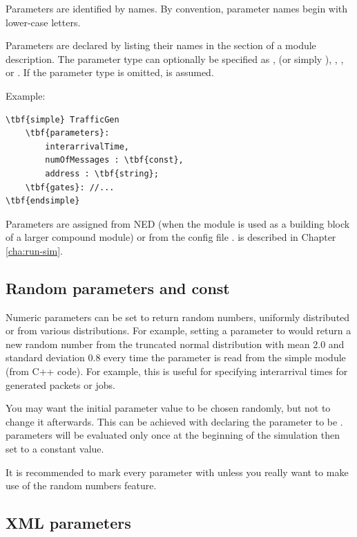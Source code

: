 Parameters are identified by names.
By convention, parameter names begin with lower-case letters.

Parameters are declared by listing their names in the
 section of a module description.
The parameter type can optionally be specified as ,
 (or simply ), , ,
or . If the parameter type is omitted,  is assumed.

Example:

\begin{Verbatim}[commandchars=\\\{\}]
\tbf{simple} TrafficGen
    \tbf{parameters}:
        interarrivalTime,
        numOfMessages : \tbf{const},
        address : \tbf{string};
    \tbf{gates}: //...
\tbf{endsimple}
\end{Verbatim}

Parameters are assigned from NED (when the module is used as a building block
of a larger compound module) or from the config file .
 is described in Chapter \ref{cha:run-sim}.


\subsection{Random parameters and const}
\label{sec:ch-ned-lang:const}

Numeric parameters can be set to return random numbers, uniformly
distributed or from various distributions. For example, setting a
parameter to  would return a new random number
from the truncated normal distribution with mean 2.0 and standard deviation 0.8
every time the parameter is read from the simple module (from C++ code).
For example, this is useful for specifying interarrival times for generated
packets or jobs.

You may want the initial parameter value to be chosen randomly, but not
to change it afterwards. This can be achieved with declaring the parameter
to be .  parameters will be evaluated only once
at the beginning of the simulation then set to a constant value.

It is recommended to mark every parameter with  unless
you really want to make use of the random numbers feature.


\subsection{XML parameters}

